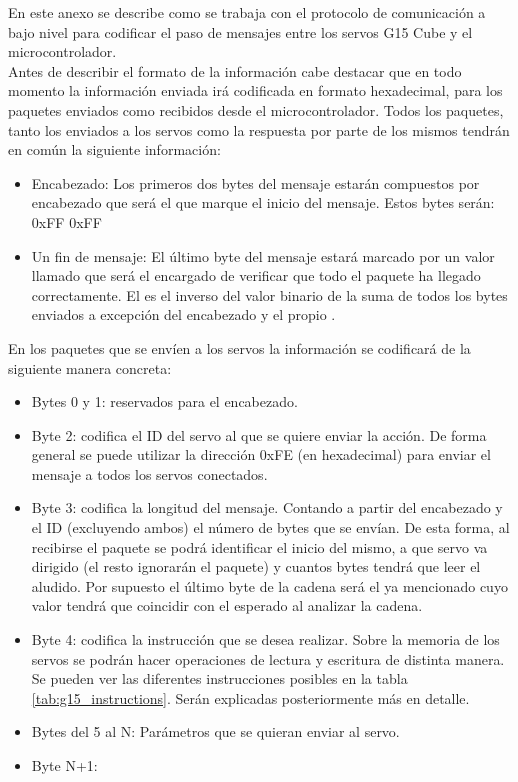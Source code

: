     
    En este anexo se describe como se trabaja con el protocolo de comunicación a bajo nivel para codificar el paso de mensajes entre los servos G15 Cube y el microcontrolador.
    \\

    Antes de describir el formato de la información cabe destacar que en todo momento la información enviada irá codificada en formato hexadecimal, para los paquetes enviados como recibidos desde el microcontrolador. Todos los paquetes, tanto los enviados a los servos como la respuesta por parte de los mismos tendrán en común la siguiente información:

    \begin{itemize}
    	\item Encabezado: Los primeros dos bytes del mensaje estarán compuestos por encabezado que será el que marque el inicio del mensaje. Estos bytes serán: 0xFF 0xFF
    	\item Un fin de mensaje: El último byte del mensaje estará marcado por un valor llamado  que será el encargado de verificar que todo el paquete ha llegado correctamente. El  es el inverso del valor binario de la suma de todos los bytes enviados a excepción del encabezado y el propio . 
    \end{itemize}


    En los paquetes que se envíen a los servos la información se codificará de la siguiente manera concreta:

    \begin{itemize}
    	\item Bytes 0 y 1: reservados para el encabezado.
    	\item Byte 2: codifica el ID del servo al que se quiere enviar la acción. De forma general se puede utilizar la dirección 0xFE (en hexadecimal) para enviar el mensaje a todos los servos conectados.
    	\item Byte 3: codifica la longitud del mensaje. Contando a partir del encabezado y el ID (excluyendo ambos) el número de bytes que se envían. De esta forma, al recibirse el paquete se podrá identificar el inicio del mismo, a que servo va dirigido (el resto ignorarán el paquete) y cuantos bytes tendrá que leer el aludido. Por supuesto el último byte de la cadena será el ya mencionado  cuyo valor tendrá que coincidir con el esperado al analizar la cadena.
    	\item Byte 4: codifica la instrucción que se desea realizar. Sobre la memoria de los servos se podrán hacer operaciones de lectura y escritura de distinta manera. Se pueden ver las diferentes instrucciones posibles en la tabla \ref{tab:g15_instructions}. Serán explicadas posteriormente más en detalle.
    	\item Bytes del 5 al N: Parámetros que se quieran enviar al servo.
    	\item Byte N+1: 
    \end{itemize}

